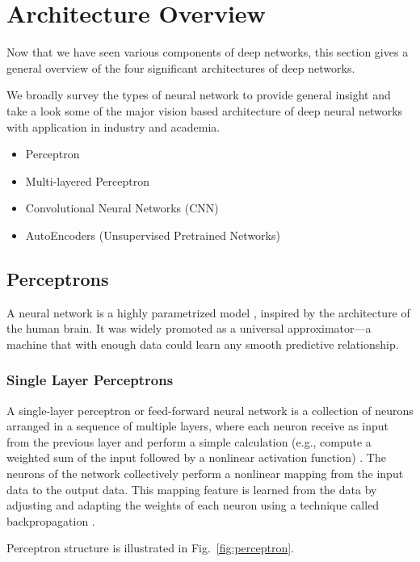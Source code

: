 \section{Architecture Overview}

Now that we have seen various components of deep networks, this section gives a general overview of the four significant architectures of deep networks.

We broadly survey the types of neural network to provide general insight and take a look some of the major vision based architecture of deep neural networks with application in industry and academia. 

\begin{itemize}
\item Perceptron
\item  Multi-layered Perceptron
\item Convolutional Neural Networks (CNN)
\item AutoEncoders (Unsupervised Pretrained Networks)
\end{itemize}

\subsection{Perceptrons}

A neural network is a highly parametrized model \cite{efron2016computer}, inspired by the architecture of the human brain. It was widely promoted as a universal approximator—a machine that with enough data could learn any smooth predictive relationship.

\subsubsection*{Single Layer Perceptrons}

A single-layer perceptron or feed-forward neural network is a collection of neurons arranged in a sequence of multiple layers, where each neuron receive as input from the previous layer and perform a simple calculation (e.g., compute a weighted sum of the input followed by a nonlinear activation function) \cite{efron2016computer}. The neurons of the network collectively perform a nonlinear mapping from the input data to the output data. This mapping feature is learned from the data by adjusting and adapting the weights of each neuron using a technique called backpropagation \cite{efron2016computer}.

Perceptron structure is illustrated in Fig.~\ref{fig:perceptron}.

